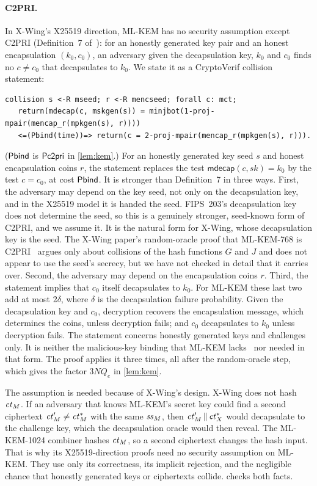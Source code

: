 \paragraph{C2PRI.} In X-Wing's X25519 direction, ML-KEM has no security
assumption except C2PRI (Definition~7 of~\cite{XWing}): for an honestly
generated key pair and an honest encapsulation $(k_0, c_0)$, an adversary
given the decapsulation key, $k_0$ and $c_0$ finds no $c \ne c_0$ that
decapsulates to $k_0$. We state it as a CryptoVerif collision statement:
\begin{lstlisting}
collision s <-R mseed; r <-R mencseed; forall c: mct;
   return(mdecap(c, mskgen(s)) = minjbot(1-proj-mpair(mencap_r(mpkgen(s), r))))
   <=(Pbind(time))=> return(c = 2-proj-mpair(mencap_r(mpkgen(s), r))).
\end{lstlisting}
($\mathsf{Pbind}$ is $\mathsf{Pc2pri}$ in \cref{lem:kem}.) For an honestly
generated key seed $s$ and honest encapsulation coins $r$, the statement
replaces the test $\mathsf{mdecap}(c, \mathit{sk}) = k_0$ by the test
$c = c_0$, at cost $\mathsf{Pbind}$. It is stronger than Definition~7 in three
ways. First, the adversary may depend on the key seed, not only on the
decapsulation key, and in the X25519 model it is handed the seed. FIPS~203's
decapsulation key does not determine the seed, so this is a genuinely
stronger, seed-known form of C2PRI, and we assume it. It is the natural form
for X-Wing, whose decapsulation key is the seed. The X-Wing paper's
random-oracle proof that ML-KEM-768 is C2PRI~\cite[Thm.~3]{XWing} argues
only about collisions of the hash functions $G$ and $J$ and does not appear
to use the seed's secrecy, but we have not checked in detail that it
carries over. Second, the adversary may depend on the encapsulation coins
$r$. Third, the statement implies that $c_0$ itself decapsulates to $k_0$.
For ML-KEM these last two add at most $2\delta$, where $\delta$ is the
decapsulation failure probability. Given the decapsulation key and $c_0$,
decryption recovers the encapsulation message, which determines the coins,
unless decryption fails; and $c_0$ decapsulates to $k_0$ unless decryption
fails. The statement concerns honestly generated keys and challenges only. It is neither the malicious-key binding that
ML-KEM lacks~\cite{Sch24} nor needed in that form. The proof applies it three
times, all after the random-oracle step, which gives the factor $3NQ_e$ in
\cref{lem:kem}.

The assumption is needed because of X-Wing's design. X-Wing does not hash
$\mathit{ct}_M$. If an adversary that knows ML-KEM's secret key could
find a second ciphertext $\mathit{ct}_M' \ne \mathit{ct}_M^*$ with the same $\mathit{ss}_M$, then
$\mathit{ct}_M' \,\|\, \mathit{ct}_X^*$ would decapsulate to the challenge key, which the
decapsulation oracle would then reveal. The ML-KEM-1024 combiner hashes
$\mathit{ct}_M$, so a second ciphertext changes the hash input. That is why its
X25519-direction proofs need no security assumption on ML-KEM. They use only
its correctness, its implicit rejection, and the negligible chance that
honestly generated keys or ciphertexts collide.  checks
both facts.

